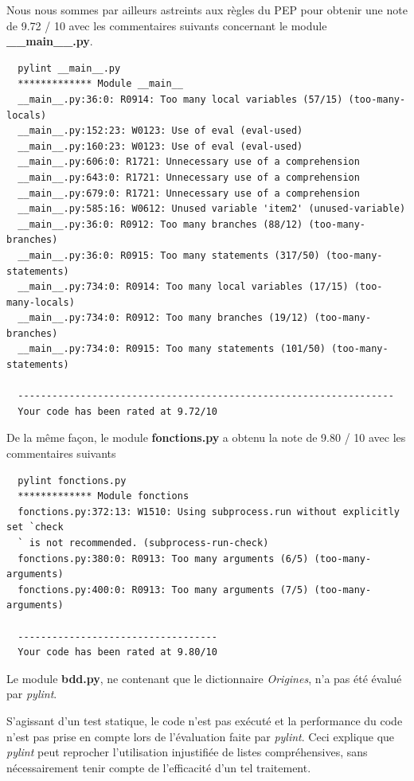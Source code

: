 \documentclass[twoside,a4paper,11pt,frenchb,openany]{report}
\begin{document}
Nous nous sommes par ailleurs astreints aux règles du PEP pour obtenir une note de 9.72 / 10 avec les commentaires suivants concernant le module \textbf{\_\_main\_\_.py}. 

\begin{verbatim}  pylint __main__.py
  ************* Module __main__
  __main__.py:36:0: R0914: Too many local variables (57/15) (too-many-locals)
  __main__.py:152:23: W0123: Use of eval (eval-used)
  __main__.py:160:23: W0123: Use of eval (eval-used)
  __main__.py:606:0: R1721: Unnecessary use of a comprehension
  __main__.py:643:0: R1721: Unnecessary use of a comprehension
  __main__.py:679:0: R1721: Unnecessary use of a comprehension
  __main__.py:585:16: W0612: Unused variable 'item2' (unused-variable)
  __main__.py:36:0: R0912: Too many branches (88/12) (too-many-branches)
  __main__.py:36:0: R0915: Too many statements (317/50) (too-many-statements)
  __main__.py:734:0: R0914: Too many local variables (17/15) (too-many-locals)
  __main__.py:734:0: R0912: Too many branches (19/12) (too-many-branches)
  __main__.py:734:0: R0915: Too many statements (101/50) (too-many-statements)

  ------------------------------------------------------------------
  Your code has been rated at 9.72/10\end{verbatim}

De la même façon, le module \textbf{fonctions.py} a obtenu la note de 9.80 / 10 avec les commentaires suivants

\begin{verbatim}  pylint fonctions.py
  ************* Module fonctions
  fonctions.py:372:13: W1510: Using subprocess.run without explicitly set `check
  ` is not recommended. (subprocess-run-check)
  fonctions.py:380:0: R0913: Too many arguments (6/5) (too-many-arguments)
  fonctions.py:400:0: R0913: Too many arguments (7/5) (too-many-arguments)

  -----------------------------------
  Your code has been rated at 9.80/10\end{verbatim}

Le module \textbf{bdd.py}, ne contenant que le dictionnaire \textit{Origines}, n'a pas été évalué par \textit{pylint}.

S'agissant d'un test statique, le code n'est pas exécuté et la performance du code n'est pas prise en compte lors de l'évaluation faite par \textit{pylint}. Ceci explique que \textit{pylint} peut reprocher l'utilisation injustifiée de listes compréhensives, sans nécessairement tenir compte de l'efficacité d'un tel traitement.
\end{document}
